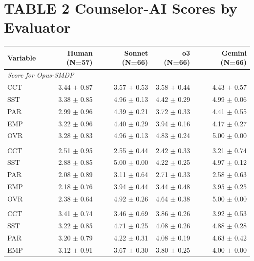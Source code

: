 \documentclass{wiley-article}
\begin{document}
\begin{table}[htbp]
  \section*{TABLE 2 Counselor-AI Scores by Evaluator}
  \centering
  \begin{threeparttable}
    \label{tab:counselorAI_scores}
    \begin{tabular}{lrrrr}
      \toprule
      \textbf{Variable} & \textbf{Human (N=57)} & \textbf{Sonnet (N=66)} & \textbf{o3 (N=66)} & \textbf{Gemini (N=66)}\\
      \midrule
      \multicolumn{5}{l}{\textit{Score for Opus-SMDP}}\\
      CCT & 3.44 $\pm$ 0.87 & 3.57 $\pm$ 0.53 & 3.58 $\pm$ 0.44 & 4.43 $\pm$ 0.57\\
      SST & 3.38 $\pm$ 0.85 & 4.96 $\pm$ 0.13 & 4.42 $\pm$ 0.29 & 4.99 $\pm$ 0.06\\
      PAR & 2.99 $\pm$ 0.96 & 4.39 $\pm$ 0.21 & 3.72 $\pm$ 0.33 & 4.41 $\pm$ 0.55\\
      EMP & 3.22 $\pm$ 0.96 & 4.40 $\pm$ 0.29 & 3.94 $\pm$ 0.16 & 4.17 $\pm$ 0.27\\
      OVR & 3.28 $\pm$ 0.83 & 4.96 $\pm$ 0.13 & 4.83 $\pm$ 0.24 & 5.00 $\pm$ 0.00\\
      \addlinespace
      \multicolumn{5}{l}{\textit{Score for GPT-zero}}\\
      CCT & 2.51 $\pm$ 0.95 & 2.55 $\pm$ 0.44 & 2.42 $\pm$ 0.33 & 3.21 $\pm$ 0.74\\
      SST & 2.88 $\pm$ 0.85 & 5.00 $\pm$ 0.00 & 4.22 $\pm$ 0.25 & 4.97 $\pm$ 0.12\\
      PAR & 2.08 $\pm$ 0.89 & 3.11 $\pm$ 0.64 & 2.71 $\pm$ 0.33 & 2.58 $\pm$ 0.63\\
      EMP & 2.18 $\pm$ 0.76 & 3.94 $\pm$ 0.44 & 3.44 $\pm$ 0.48 & 3.95 $\pm$ 0.25\\
      OVR & 2.38 $\pm$ 0.64 & 4.92 $\pm$ 0.26 & 4.64 $\pm$ 0.38 & 5.00 $\pm$ 0.00\\
      \addlinespace
      \multicolumn{5}{l}{\textit{Score for GPT-SMDP}}\\
      CCT & 3.41 $\pm$ 0.74 & 3.46 $\pm$ 0.69 & 3.86 $\pm$ 0.26 & 3.92 $\pm$ 0.53\\
      SST & 3.22 $\pm$ 0.85 & 4.71 $\pm$ 0.25 & 4.08 $\pm$ 0.26 & 4.88 $\pm$ 0.28\\
      PAR & 3.20 $\pm$ 0.79 & 4.22 $\pm$ 0.31 & 4.08 $\pm$ 0.19 & 4.63 $\pm$ 0.42\\
      EMP & 3.12 $\pm$ 0.91 & 3.67 $\pm$ 0.30 & 3.80 $\pm$ 0.25 & 4.00 $\pm$ 0.00\\

\end{tabular}
\end{threeparttable}
\end{table}
\end{document}
